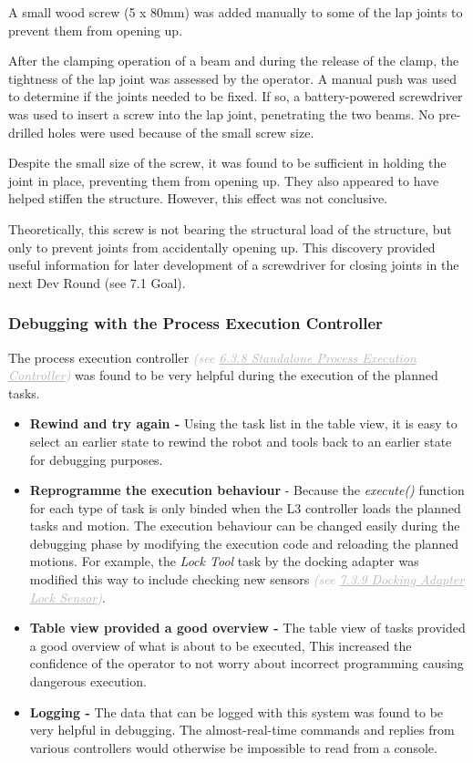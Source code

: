 A small wood screw (5 x 80mm) was added manually to some of the lap joints to prevent them from opening up. 

After the clamping operation of a beam and during the release of the clamp, the tightness of the lap joint was assessed by the operator. A manual push was used to determine if the joints needed to be fixed. If so, a battery-powered screwdriver was used to insert a screw into the lap joint, penetrating the two beams. No pre-drilled holes were used because of the small screw size. 

Despite the small size of the screw, it was found to be sufficient in holding the joint in place, preventing them from opening up. They also appeared to have helped stiffen the structure. However, this effect was not conclusive.

Theoretically, this screw is not bearing the structural load of the structure, but only to prevent joints from accidentally opening up. This discovery provided useful information for later development of a screwdriver for closing joints in the next Dev Round (see 7.1 Goal). 

\subsubsection{Debugging with the Process Execution Controller}

The process execution controller \textit{\textcolor[HTML]{B7B7B7}{(see \uline{6.3.8 Standalone Process Execution Controller})}} was found to be very helpful during the execution of the planned tasks. 

\begin{itemize}
	\item \textbf{Rewind and try again - }Using the task list in the table view, it is easy to select an earlier state to rewind the robot and tools back to an earlier state for debugging purposes.

	\item \textbf{Reprogramme the execution behaviour} - Because the \textit{execute() }function for each type of task is only binded when the L3 controller loads the planned tasks and motion. The execution behaviour can be changed easily during the debugging phase by modifying the execution code and reloading the planned motions. For example, the \textit{Lock Tool }task by the docking adapter was modified this way to include checking new sensors \textit{\textcolor[HTML]{B7B7B7}{(see \uline{7.3.9 Docking Adapter Lock Sensor})}}.

	\item \textbf{Table view provided a good overview - }The table view of tasks provided a good overview of what is about to be executed, This increased the confidence of the operator to not worry about incorrect programming causing dangerous execution.

	\item \textbf{Logging - }The data that can be logged with this system was found to be very helpful in debugging. The almost-real-time commands and replies from various controllers would otherwise be impossible to read from a console.

\end{itemize}
